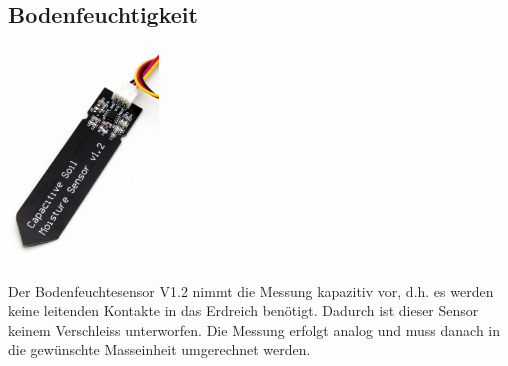 \documentclass[
  12pt, %
  a4paper, %
  oneside, %
  openany, 
  numbers=noenddot, %
  BCOR=5mm, %
  parskip=half*, %
  thesis, %
]{bfhbook}
\newcommand{\compImgSize}{4cm}
\begin{document}
\subsection{Bodenfeuchtigkeit}\label{moistV1.2}
\begin{minipage}[t]{0.5\linewidth}
\includegraphics[width=\compImgSize, left, valign=t]{Bilder/Soil-2.jpg}%
\label{labelname}
\end{minipage}
\begin{minipage}[t]{0.5\linewidth}
Der Bodenfeuchtesensor V1.2 \footnotemark nimmt die Messung kapazitiv vor, d.h. es werden keine leitenden Kontakte in das Erdreich benötigt. Dadurch ist dieser Sensor keinem Verschleiss unterworfen. Die Messung erfolgt analog und muss danach in die gewünschte Masseinheit umgerechnet werden.
\end{minipage}
 
\end{document}
